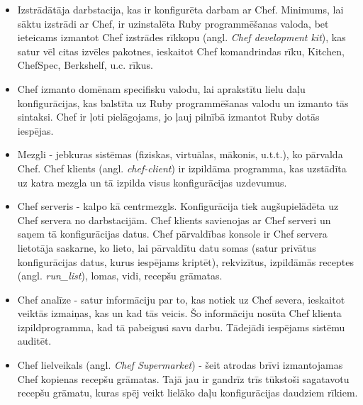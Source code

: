 \begin{itemize}
	\item Izstrādātāja darbstacija, kas ir konfigurēta darbam ar Chef. Minimums, lai sāktu izstrādi ar Chef, ir uzinstalēta Ruby programmēšanas valoda, bet ieteicams izmantot Chef izstrādes rīkkopu (angl. \textit{Chef development kit}), kas satur vēl citas izvēles pakotnes, ieskaitot Chef komandrindas rīku, Kitchen, ChefSpec, Berkshelf, u.c. rīkus.
	\item Chef izmanto domēnam specifisku valodu, lai aprakstītu lielu daļu konfigurācijas, kas balstīta uz Ruby programmēšanas valodu un izmanto tās sintaksi. Chef ir ļoti pielāgojams, jo ļauj pilnībā izmantot Ruby dotās iespējas.
	\item Mezgli - jebkuras sistēmas (fiziskas, virtuālas, mākonis, u.t.t.), ko pārvalda Chef. Chef klients (angl. \textit{chef-client}) ir izpildāma programma, kas uzstādīta uz katra mezgla un tā izpilda visus konfigurācijas uzdevumus.
	\item Chef serveris - kalpo kā centrmezgls. Konfigurācija tiek augšupielādēta uz Chef servera no darbstacijām. Chef klients savienojas ar Chef serveri un saņem tā konfigurācijas datus.
	Chef pārvaldības konsole ir Chef servera lietotāja saskarne, ko lieto, lai pārvaldītu datu somas (satur privātus konfigurācijas datus, kurus iespējams kriptēt), rekvizītus, izpildāmās receptes (angl. \textit{run_list}), lomas, vidi, recepšu grāmatas.
	\item Chef analīze - satur informāciju par to, kas notiek uz Chef severa, ieskaitot veiktās izmaiņas, kas un kad tās veicis. Šo informāciju nosūta Chef klienta izpildprogramma, kad tā pabeigusi savu darbu. Tādejādi iespējams sistēmu auditēt.
	\item Chef lielveikals (angl. \textit{Chef Supermarket}) - šeit atrodas brīvi izmantojamas Chef kopienas recepšu grāmatas. Tajā jau ir gandrīz trīs tūkstoši sagatavotu recepšu grāmatu, kuras spēj veikt lielāko daļu konfigurācijas daudziem rīkiem.
\end{itemize}



